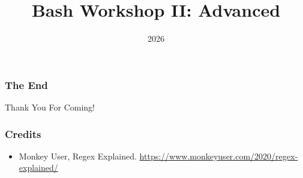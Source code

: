 \documentclass{beamer}
\title{Bash Workshop II: Advanced}
\institute{Tech GC}
\date{2026}
\begin{document}
\frame{\titlepage}




\begin{frame}
\frametitle{The End}
\vspace{1cm}
\centering \Huge {Thank You For Coming!}
\end{frame}

\begin{frame}
\frametitle{Credits}
\begin{itemize}
    \item Monkey User, Regex Explained.
        \url{https://www.monkeyuser.com/2020/regex-explained/}
\end{itemize}
\end{frame}
\end{document}
